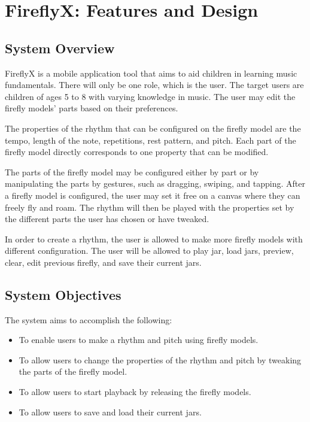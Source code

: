 %
%
%                 

\chapter{FireflyX: Features and Design}

\section{System Overview}
FireflyX is a mobile application tool that aims to aid children in learning music fundamentals. There will only be one role, which is the user. The target users are children of ages 5 to 8 with varying knowledge in music. The user may edit the firefly models' parts based on their preferences.

The properties of the rhythm that can be configured on the firefly model are the tempo, length of the note, repetitions, rest pattern, and pitch. Each part of the firefly model directly corresponds to one property that can be modified.

The parts of the firefly model may be configured either by part or by manipulating the parts by gestures, such as dragging, swiping, and tapping. After a firefly model is configured, the user may set it free on a canvas where they can freely fly and roam. The rhythm will then be played with the properties set by the different parts the user has chosen or have tweaked. 

In order to create a rhythm, the user is allowed to make more firefly models with different configuration. The user will be allowed to play jar, load jars, preview, clear, edit previous firefly, and save their current jars.

\section{System Objectives}
The system aims to accomplish the following:
\begin{itemize}
    \item To enable users to make a rhythm and pitch using firefly models.
    \item To allow users to change the properties of the rhythm and pitch by tweaking the parts of the firefly model.
    \item To allow users to start playback by releasing the firefly models.
    \item To allow users to save and load their current jars.
\end{itemize}
